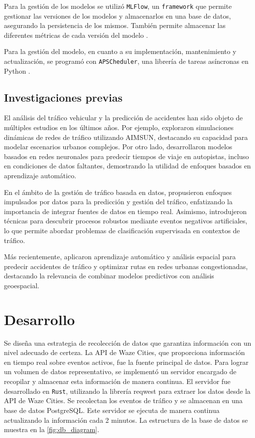 \documentclass[12pt]{article}
\begin{document}
Para la gestión de los modelos se utilizó \texttt{MLFlow}, un \texttt{framework} que permite gestionar las versiones de los modelos y almacenarlos en una base de datos, asegurando la persistencia de los mismos. También permite almacenar las diferentes métricas de cada versión del modelo \citep{mlflow2025}.

Para la gestión del modelo, en cuanto a su implementación, mantenimiento y actualización, se programó con \texttt{APSCheduler}, una librería de tareas asíncronas en Python \citep{apscheduler2025}.

\subsection{Investigaciones previas}

El análisis del tráfico vehicular y la predicción de accidentes han sido objeto de múltiples estudios en los últimos años. Por ejemplo, \citet{barcelo2005} exploraron simulaciones dinámicas de redes de tráfico utilizando AIMSUN, destacando su capacidad para modelar escenarios urbanos complejos. Por otro lado, \citet{vanlint2005} desarrollaron modelos basados en redes neuronales para predecir tiempos de viaje en autopistas, incluso en condiciones de datos faltantes, demostrando la utilidad de enfoques basados en aprendizaje automático.

En el ámbito de la gestión de tráfico basada en datos, \citet{chen2015} propusieron enfoques impulsados por datos para la predicción y gestión del tráfico, enfatizando la importancia de integrar fuentes de datos en tiempo real. Asimismo, \citet{goedertier2009robust} introdujeron técnicas para descubrir procesos robustos mediante eventos negativos artificiales, lo que permite abordar problemas de clasificación supervisada en contextos de tráfico.

Más recientemente, \citet{berhanu2024} aplicaron aprendizaje automático y análisis espacial para predecir accidentes de tráfico y optimizar rutas en redes urbanas congestionadas, destacando la relevancia de combinar modelos predictivos con análisis geoespacial.

\section{Desarrollo}

Se diseña una estrategia de recolección de datos que garantiza información con un nivel adecuado de certeza. La API de Waze Cities, que proporciona información en tiempo real sobre eventos activos, fue la fuente principal de datos. Para lograr un volumen de datos representativo, se implementó un servidor encargado de recopilar y almacenar esta información de manera continua. El servidor fue desarrollado en \texttt{Rust}, utilizando la librería reqwest \citep{reqwest2025} para extraer los datos desde la API de Waze Cities. Se recolectan los eventos de tráfico y se almacenan en una base de datos PostgreSQL. Este servidor se ejecuta de manera continua actualizando la información cada 2 minutos. La estructura de la base de datos se muestra en la \cref{fig:db_diagram}.
\end{document}

